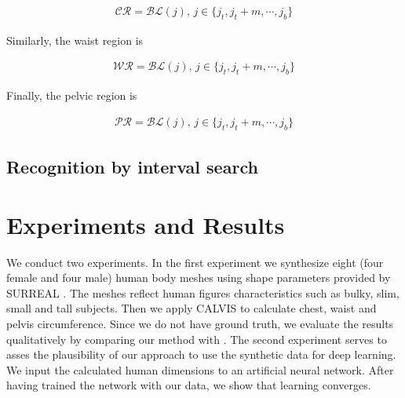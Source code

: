 \documentclass[runningheads]{llncs}
\begin{document}
\begin{align}
\mathcal{CR} = \mathcal{BL}(j), \, j \in \{j_t, j_t+m, \cdots, j_b\}
\end{align}

Similarly, the waist region is

\begin{align}
\mathcal{WR} = \mathcal{BL}(j), \, j \in \{j_t, j_t+m, \cdots, j_b\}
\end{align}

Finally, the pelvic region is

\begin{align}
\mathcal{PR} = \mathcal{BL}(j), \, j \in \{j_t, j_t+m, \cdots, j_b\}
\end{align}

\subsection{Recognition by interval search}\label{subsec:interval_search}





\section{Experiments and Results}

We conduct two experiments. In the first experiment we synthesize eight (four 
female and four male) human body meshes using shape parameters provided by 
SURREAL \cite{varol17_surreal}.
The meshes reflect human figures characteristics such as bulky, slim, small and 
tall subjects. Then we apply CALVIS to calculate chest, waist and pelvis 
circumference. Since we do not have ground truth, we evaluate the results 
qualitatively by comparing our method 
with \cite{Dibra.2016b}.
The second 
experiment serves to asses the plausibility of our approach to use the 
synthetic data for deep learning. We input the calculated human 
dimensions to an artificial neural network. After having trained the network 
with our data, we show that learning converges.
\end{document}

